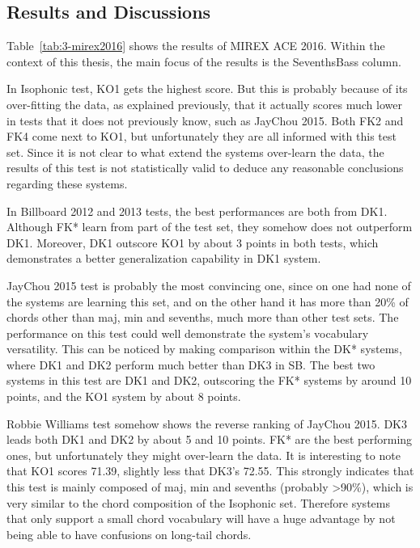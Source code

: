 \subsection{Results and Discussions}
Table~\ref{tab:3-mirex2016} shows the results of MIREX ACE 2016. Within the context of this thesis, the main focus of the results is the SeventhsBass column.

In Isophonic test, KO1 gets the highest score. But this is probably because of its over-fitting the data, as explained previously, that it actually scores much lower in tests that it does not previously know, such as JayChou 2015. Both FK2 and FK4 come next to KO1, but unfortunately they are all informed with this test set. Since it is not clear to what extend the systems over-learn the data, the results of this test is not statistically valid to deduce any reasonable conclusions regarding these systems.

In Billboard 2012 and 2013 tests, the best performances are both from DK1. Although FK* learn from part of the test set, they somehow does not outperform DK1. Moreover, DK1 outscore KO1 by about 3 points in both tests, which demonstrates a better generalization capability in DK1 system.

JayChou 2015 test is probably the most convincing one, since on one had none of the systems are learning this set, and on the other hand it has more than 20\% of chords other than maj, min and sevenths, much more than other test sets. The performance on this test could well demonstrate the system's vocabulary versatility. This can be noticed by making comparison within the DK* systems, where DK1 and DK2 perform much better than DK3 in SB. The best two systems in this test are DK1 and DK2, outscoring the FK* systems by around 10 points, and the KO1 system by about 8 points.

Robbie Williams test somehow shows the reverse ranking of JayChou 2015. DK3 leads both DK1 and DK2 by about 5 and 10 points. FK* are the best performing ones, but unfortunately they might over-learn the data. It is interesting to note that KO1 scores 71.39, slightly less that DK3's 72.55. This strongly indicates that this test is mainly composed of maj, min and sevenths (probably >90\%), which is very similar to the chord composition of the Isophonic set. Therefore systems that only support a small chord vocabulary will have a huge advantage by not being able to have confusions on long-tail chords.

